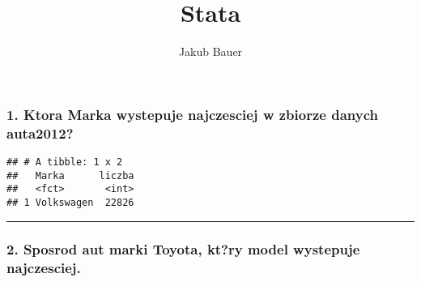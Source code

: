 \documentclass[]{article}
\title{Stata}
\author{Jakub Bauer}
\date{}
\newenvironment{Shaded}{\begin{snugshade}}{\end{snugshade}}
\newcommand{\KeywordTok}[1]{\textcolor[rgb]{0.13,0.29,0.53}{\textbf{#1}}}
\newcommand{\DataTypeTok}[1]{\textcolor[rgb]{0.13,0.29,0.53}{#1}}
\newcommand{\StringTok}[1]{\textcolor[rgb]{0.31,0.60,0.02}{#1}}
\newcommand{\OperatorTok}[1]{\textcolor[rgb]{0.81,0.36,0.00}{\textbf{#1}}}
\newcommand{\NormalTok}[1]{#1}
\begin{document}
\maketitle

\subsubsection{1. Ktora Marka wystepuje najczesciej w zbiorze danych
auta2012?}\label{ktora-marka-wystepuje-najczesciej-w-zbiorze-danych-auta2012}

\begin{Shaded}
\end{Shaded}

\begin{verbatim}
## # A tibble: 1 x 2
##   Marka      liczba
##   <fct>       <int>
## 1 Volkswagen  22826
\end{verbatim}

\begin{center}\rule{0.5\linewidth}{\linethickness}\end{center}

\subsubsection{2. Sposrod aut marki Toyota, kt?ry model wystepuje
najczesciej.}\label{sposrod-aut-marki-toyota-ktry-model-wystepuje-najczesciej.}

\begin{Shaded}
\end{Shaded}
\end{document}
